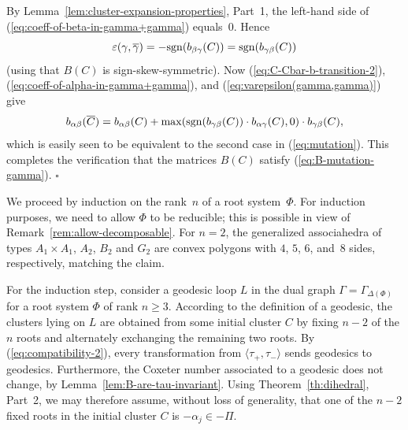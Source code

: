 \documentclass[letterpaper]{amsart}
\numberwithin{equation}{section}
\theoremstyle{definition}
\newtheorem{remark}[theorem]{Remark}
\newcommand{\credit}[1]{\smallskip\noindent {\textbf{#1.\ }}}
\def\endproof{\hfill$\square$\medskip}
\begin{document}
By Lemma~\ref{lem:cluster-expansion-properties}, Part~1, the left-hand 
side of (\ref{eq:coeff-of-beta-in-gamma+gamma}) equals~0. 
Hence 
\begin{equation} 
\label{eq:varepsilon(gamma,gamma)} 
\varepsilon(\gamma, \overline \gamma) = - {\rm sgn}(b_{\beta \gamma}(C)) 
= {\rm sgn}(b_{\gamma \beta}(C)) 
\end{equation} 
(using that $B(C)$ is sign-skew-symmetric). 
Now (\ref{eq:C-Cbar-b-transition-2}), 
(\ref{eq:coeff-of-alpha-in-gamma+gamma}), and 
(\ref{eq:varepsilon(gamma,gamma)}) give 
$$b_{\alpha \beta}(\overline C) =  b_{\alpha \beta}(C) + 
\max({\rm sgn}(b_{\gamma \beta}(C)) \cdot b_{\alpha \gamma} (C), 0) 
\cdot b_{\gamma \beta}(C),$$ 
which is easily seen to be equivalent to the second case in 
(\ref{eq:mutation}). 
This completes the verification that the matrices $B(C)$ satisfy 
(\ref{eq:B-mutation-gamma}). 
\endproof 
 
 
 
 
 
 
 
 
 
 
\credit{Proof of {\rm(\ref{eq:geodesic-loops})}} 
We proceed by induction on the rank~$n$ of a root system~$\Phi$. 
For induction purposes, we need to allow $\Phi$ to be 
reducible; this is possible in view of 
Remark~\ref{rem:allow-decomposable}. 
For $n=2$, the generalized associahedra of types $A_1 \times A_1$, 
$A_2$, $B_2$ and $G_2$ are convex polygons with $4$, 
$5$, $6$, and~$8$ sides, respectively, matching the claim. 
 
For the induction step, consider a geodesic loop $L$ in the dual graph 
$\Gamma = \Gamma_{\Delta (\Phi)}$ for a root system 
$\Phi$ of rank $n \geq 3$. 
According to the definition of a geodesic, 
the clusters lying on $L$ are obtained from some initial cluster 
$C$ by fixing \hbox{$n-2$} of the $n$ roots and alternately exchanging the 
remaining two roots. 
By (\ref{eq:compatibility-2}), 
every transformation 
from $\langle \tau_+, \tau_- \rangle$ sends  geodesics to geodesics. 
Furthermore, the Coxeter number associated to a geodesic does not 
change, by Lemma~\ref{lem:B-are-tau-invariant}. 
Using Theorem~\ref{th:dihedral}, Part~2, we may therefore assume, 
without loss of generality, 
that one of the $n-2$ fixed roots in the initial cluster $C$ is $-\alpha_j \in-\Pi$. 
 
\end{document}
